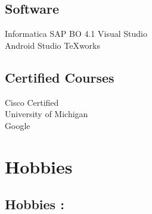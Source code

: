 \documentclass[a4paper]{deedy-resume} %
\begin{document}
\begin{minipage}[t]{0.33\textwidth}
\subsection{Software}
Informatica \textbullet{} SAP BO 4.1 \textbullet{} Visual Studio\\  Android Studio 
\textbullet{} TeXworks

\sectionspace
\subsection{Certified Courses}
 \textbullet{} Cisco Certified\\
 \textbullet{} University of Michigan\\
 \textbullet{} Google 
\sectionspace %

\section{Hobbies}
\subsection{Hobbies : }

 \textbullet{} 

 \textbullet{} 

 \textbullet{} 

 \textbullet{} 


\sectionspace %

\end{minipage} %
\hfill
%
%
\end{document}
